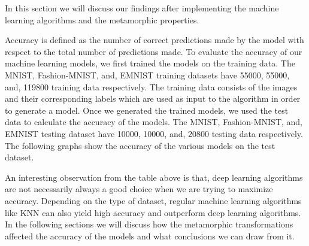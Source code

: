 In this section we will discuss our findings after implementing the machine learning algorithms and the metamorphic properties.

Accuracy is defined as the number of correct predictions made by the model with respect to the total number of predictions made. To evaluate the accuracy of our machine learning models, we first trained the models on the training data. The MNIST, Fashion-MNIST, and, EMNIST training datasets have 55000, 55000, and, 119800 training data respectively. The training data consists of the images and their corresponding labels which are used as input to the algorithm in order to generate a model. Once we generated the trained models, we used the test data to calculate the accuracy of the models. The MNIST, Fashion-MNIST, and, EMNIST testing dataset have 10000, 10000, and, 20800 testing data respectively. The following graphs show the accuracy of the various models on the test dataset.

\accuracy
    
\begin{center}
\end{center}{}
An interesting observation from the table above is that, deep learning algorithms are not necessarily always a good choice when we are trying to maximize accuracy. Depending on the type of dataset, regular machine learning algorithms like KNN can also yield high accuracy and outperform deep learning algorithms.
In the following sections we will discuss how the metamorphic transformations affected the accuracy of the models and what conclusions we can draw from it.
